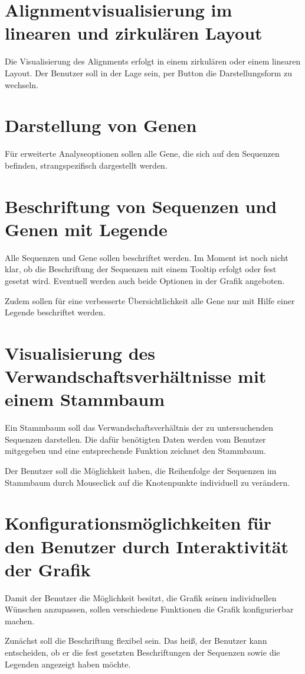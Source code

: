 \documentclass[a4paper]{scrreprt}
\begin{document}
\section{Alignmentvisualisierung im linearen und zirkulären Layout}
Die Visualisierung des Alignments erfolgt in einem zirkulären oder einem linearen Layout. Der Benutzer soll in der Lage sein, per Button die Darstellungsform zu wechseln.
\section{Darstellung von Genen}
Für erweiterte Analyseoptionen sollen alle Gene, die sich auf den Sequenzen befinden, strangspezifisch dargestellt werden. 
\section{Beschriftung von Sequenzen und Genen mit Legende}
Alle Sequenzen und Gene sollen beschriftet werden. Im Moment ist noch nicht klar, ob die Beschriftung der Sequenzen mit einem Tooltip erfolgt oder fest gesetzt wird. Eventuell werden auch beide Optionen in der Grafik angeboten.

Zudem sollen für eine verbesserte Übersichtlichkeit alle Gene nur mit Hilfe einer Legende beschriftet werden.

\section{Visualisierung des Verwandschaftsverhältnisse mit einem Stammbaum}
Ein Stammbaum soll das Verwandschaftsverhältnis der zu untersuchenden Sequenzen darstellen. Die dafür benötigten Daten werden vom Benutzer mitgegeben und eine entsprechende Funktion zeichnet den Stammbaum. 

Der Benutzer soll die Möglichkeit haben, die Reihenfolge der Sequenzen im Stammbaum durch Mouseclick auf die Knotenpunkte individuell zu verändern.

\section{Konfigurationsmöglichkeiten für den Benutzer durch Interaktivität der Grafik}
Damit der Benutzer die Möglichkeit besitzt, die Grafik seinen individuellen Wünschen anzupassen, sollen verschiedene Funktionen die Grafik konfigurierbar machen.

Zunächst soll die Beschriftung flexibel sein. Das heiß, der Benutzer kann entscheiden, ob er die fest gesetzten Beschriftungen der Sequenzen sowie die Legenden angezeigt haben möchte.
\end{document}
